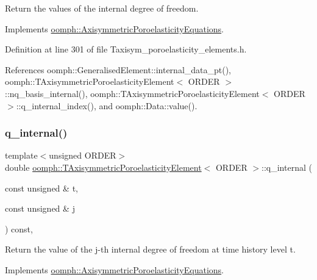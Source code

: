 Return the values of the internal degree of freedom. 



Implements \hyperlink{classoomph_1_1AxisymmetricPoroelasticityEquations_aa8e09704efd83dcc29b6d10c7d67fd0a}{oomph\+::\+Axisymmetric\+Poroelasticity\+Equations}.



Definition at line 301 of file Taxisym\+\_\+poroelasticity\+\_\+elements.\+h.



References oomph\+::\+Generalised\+Element\+::internal\+\_\+data\+\_\+pt(), oomph\+::\+T\+Axisymmetric\+Poroelasticity\+Element$<$ O\+R\+D\+E\+R $>$\+::nq\+\_\+basis\+\_\+internal(), oomph\+::\+T\+Axisymmetric\+Poroelasticity\+Element$<$ O\+R\+D\+E\+R $>$\+::q\+\_\+internal\+\_\+index(), and oomph\+::\+Data\+::value().

\mbox{\label{classoomph_1_1TAxisymmetricPoroelasticityElement_a0fd7afe9fbe587b86fd77317194180b9}} 
\subsubsection{\texorpdfstring{q\+\_\+internal()}{q\_internal()}\hspace{0.1cm}{\footnotesize\ttfamily [2/2]}}
{\footnotesize\ttfamily template$<$unsigned O\+R\+D\+ER$>$ \\
double \hyperlink{classoomph_1_1TAxisymmetricPoroelasticityElement}{oomph\+::\+T\+Axisymmetric\+Poroelasticity\+Element}$<$ O\+R\+D\+ER $>$\+::q\+\_\+internal (\begin{DoxyParamCaption}\item[{const unsigned \&}]{t,  }\item[{const unsigned \&}]{j }\end{DoxyParamCaption}) const\hspace{0.3cm}{\ttfamily [inline]}, {\ttfamily [virtual]}}



Return the value of the j-\/th internal degree of freedom at time history level t. 



Implements \hyperlink{classoomph_1_1AxisymmetricPoroelasticityEquations_acd7198ede00dbfeacf2bc576b688f54b}{oomph\+::\+Axisymmetric\+Poroelasticity\+Equations}.



